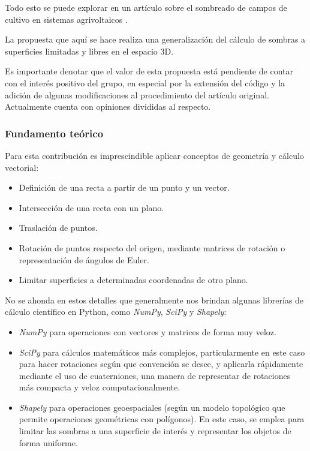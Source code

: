 Todo esto se puede explorar en un artículo sobre el sombreado de campos de cultivo en sistemas agrivoltaicos \cite{Zainali_Ma_Lu_Stridh_Avelin_Amaducci_Colauzzi_Campana_2023}.

La propuesta que aquí se hace realiza una generalización del cálculo de sombras a superficies limitadas y libres en el espacio 3D.

Es importante denotar que el valor de esta propuesta está pendiente de contar con el interés positivo del grupo, en especial por la extensión del código y la adición de algunas modificaciones al procedimiento del artículo original. Actualmente cuenta con opiniones divididas al respecto.

\subsubsection{Fundamento teórico}

Para esta contribución es imprescindible aplicar conceptos de geometría y cálculo vectorial:

\begin{itemize}
    \item Definición de una recta a partir de un punto y un vector.
    \item Intersección de una recta con un plano.
    \item Traslación de puntos.
    \item Rotación de puntos respecto del origen, mediante matrices de rotación o representación de ángulos de Euler.
    \item Limitar superficies a determinadas coordenadas de otro plano.
\end{itemize}

No se ahonda en estos detalles que generalmente nos brindan algunas librerías de cálculo científico en Python, como \textit{NumPy}, \textit{SciPy} y \textit{Shapely}:

\begin{itemize}
    \item \textit{NumPy} para operaciones con vectores y matrices de forma muy veloz.
    \item \textit{SciPy} para cálculos matemáticos más complejos, particularmente en este caso para hacer rotaciones según que convención se desee, y aplicarla rápidamente mediante el uso de cuaterniones, una manera de representar de rotaciones más compacta y veloz computacionalmente.
    \item \textit{Shapely} para operaciones geoespaciales (según un modelo topológico que permite operaciones geométricas con polígonos). En este caso, se emplea para limitar las sombras a una superficie de interés y representar los objetos de forma uniforme.
\end{itemize}

